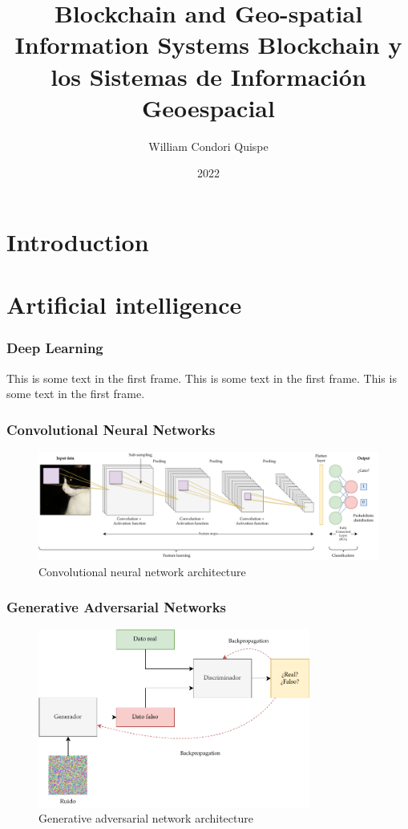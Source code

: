 \documentclass[8.5pt]{beamer}
\title[]{
Blockchain and Geo-spatial Information Systems 
\small{
Blockchain y los Sistemas de Información Geoespacial
}
}
\author{William Condori Quispe}
\institute{Unversidad Nacional Amazónica de Madre de Dios}
\date{2022}
\begin{document}
\maketitle

\section{Introduction}
\section{Artificial intelligence}

\begin{frame}
\frametitle{Deep Learning}
This is some text in the first frame. This is some text in the first frame. This is some text in the first frame.
\end{frame}

\begin{frame}
\frametitle{Convolutional Neural Networks}
\begin{figure}
    \centering
    \includegraphics[width=1\textwidth]{images/cnn.pdf}
    \caption{Convolutional neural network architecture}
    \label{fig:cnn}
\end{figure}
\end{frame}

\begin{frame}
\frametitle{Generative Adversarial Networks}
\begin{figure}
    \centering
    \includegraphics[width=0.8\textwidth]{images/gan.pdf}
    \caption{Generative adversarial network architecture}
    \label{fig:gan}
\end{figure}
\end{frame}
\end{document}
